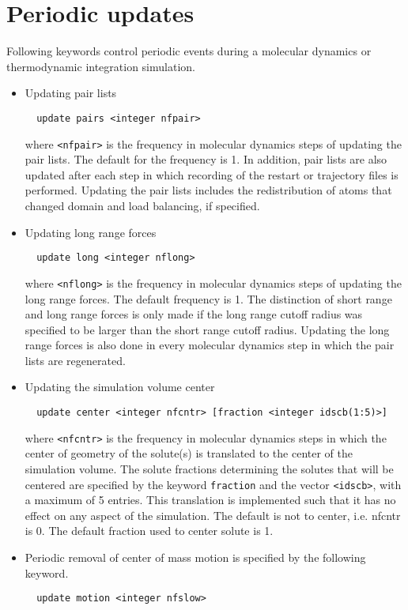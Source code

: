\section{Periodic updates}
Following keywords control periodic events during a molecular
dynamics or thermodynamic integration simulation.
\begin{itemize}
\item
Updating pair lists
\begin{verbatim}
  update pairs <integer nfpair>
\end{verbatim}
where \verb+<nfpair>+ is the frequency in molecular dynamics steps of 
updating the pair lists. The default for the frequency is 1.
In addition, pair lists are also updated after each step in which
recording of the restart or trajectory files is performed. Updating
the pair lists includes the redistribution of atoms that changed
domain and load balancing, if specified.
\item
Updating long range forces
\begin{verbatim}
  update long <integer nflong>
\end{verbatim}
where \verb+<nflong>+ is the frequency in molecular dynamics steps 
of updating the long range forces. The default frequency is 1.
The distinction of short range and long range forces is only
made if the long range cutoff radius was specified to be larger
than the short range cutoff radius. Updating the long range forces
is also done in every molecular dynamics step in which the
pair lists are regenerated.
\item
Updating the simulation volume center
\begin{verbatim}
  update center <integer nfcntr> [fraction <integer idscb(1:5)>]
\end{verbatim}
where \verb+<nfcntr>+ is the frequency in molecular dynamics steps in 
which the center of geometry of the solute(s) is translated to the
center of the simulation volume. The solute fractions determining the
solutes that will be centered are specified by the keyword 
{\tt fraction} and the vector \verb+<idscb>+, with a maximum of 5 entries.
This translation is implemented such that it has no effect on any 
aspect of the simulation. The default is not to center, i.e. nfcntr is
0. The default fraction used to center solute is 1.
\item
Periodic removal of center of mass motion is specified by the
following keyword.
\begin{verbatim}
  update motion <integer nfslow>
\end{verbatim}

\end{itemize}

